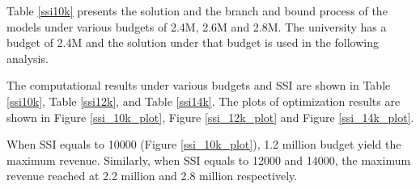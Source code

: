 \documentclass[12pt,english]{report}
\begin{document}
Table \ref{ssi10k}  presents the solution and the branch and bound process
of the models under various budgets of 2.4M, 2.6M and 2.8M. 
The university has a budget of 2.4M and the solution under that budget is used
in the following analysis.

The computational results under various budgets and SSI are shown in Table
\ref{ssi10k}, Table \ref{ssi12k}, and Table \ref{ssi14k}.
The plots of optimization results are shown in  Figure \ref{ssi_10k_plot},
Figure \ref{ssi_12k_plot} and Figure \ref{ssi_14k_plot}.


When SSI equals to 10000 (Figure \ref{ssi_10k_plot}), 1.2 million budget yield
the maximum revenue. Similarly, when SSI equals to 12000 and 14000, the maximum
revenue reached at 2.2 million and 2.8 million respectively.



%
%
\end{document}
